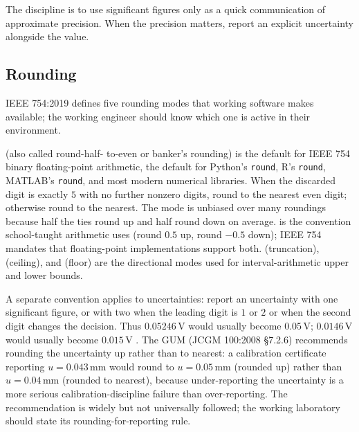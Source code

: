 The discipline is to use significant figures only as a quick
communication of approximate precision. When the precision matters,
report an explicit uncertainty alongside the value.

\subsection{Rounding}

IEEE 754:2019 defines five rounding modes that working software
makes available; the working engineer should know which one is
active in their environment.

 (also called round-half-
to-even or banker's rounding) is the default for IEEE 754 binary
floating-point arithmetic, the default for Python's
\texttt{round}, R's \texttt{round}, MATLAB's \texttt{round}, and
most modern numerical libraries. When the discarded digit is
exactly $5$ with no further nonzero digits, round to the nearest
even digit; otherwise round to the nearest. The mode is unbiased
over many roundings because half the ties round up and half round
down on average. 
is the convention school-taught arithmetic uses (round $0.5$ up,
round $-0.5$ down); IEEE 754 mandates that floating-point
implementations support both. 
(truncation),  (ceiling), and
 (floor) are the directional
modes used for interval-arithmetic upper and lower bounds.

A separate convention applies to uncertainties: report an
uncertainty with one significant figure, or with two when the
leading digit is $1$ or $2$ or when the second digit changes the
decision. Thus $0.05246\,\si{\volt}$ would usually become
$0.05\,\si{\volt}$; $0.0146\,\si{\volt}$ would usually become
$0.015\,\si{\volt}$ \cite{std:nist-sp811}. The GUM (JCGM 100:2008
\S 7.2.6) recommends rounding the uncertainty up rather than to
nearest: a calibration certificate reporting $u = 0.043\,\si{
\milli\meter}$ would round to $u = 0.05\,\si{\milli\meter}$
(rounded up) rather than $u = 0.04\,\si{\milli\meter}$ (rounded
to nearest), because under-reporting the uncertainty is a more
serious calibration-discipline failure than over-reporting. The
recommendation is widely but not universally followed; the
working laboratory should state its rounding-for-reporting rule.

